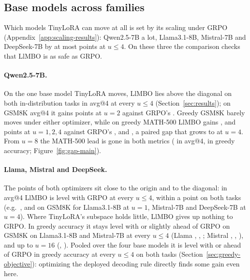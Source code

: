 \documentclass[twoside]{article}
\newcommand{\llmbo}{LlMBO}
\begin{document}
\subsection{Base models across families}
\label{sec:base}
\label{sec:scale}
\label{sec:gains}
\label{sec:per-model-base}

Which models TinyLoRA can move at all is set by its scaling under GRPO (Appendix~\ref{app:scaling-results}): Qwen2.5-7B a lot, Llama3.1-8B, Mistral-7B and DeepSeek-7B by at most \othersTinyBest{} points at $u \le 4$. On these three the comparison checks that \llmbo{} is as safe as GRPO.

\paragraph{Qwen2.5-7B.} On the one base model TinyLoRA moves, \llmbo{} lies above the diagonal on both in-distribution tasks in avg@4 at every $u \le 4$ (Section~\ref{sec:results}); on GSM8K avg@4 it gains \gainToneMeanQwenUTwoGsm{} points at $u = 2$ against GRPO's \gainGrpoMeanQwenUTwoGsm{}. Greedy GSM8K barely moves under either optimizer, while on greedy MATH-500 \llmbo{} gains \gainGreedyGreedyQwenUOneMathFive{}, \gainGreedyGreedyQwenUTwoMathFive{} and \gainGreedyGreedyQwenUFourMathFive{} points at $u = 1, 2, 4$ against GRPO's \gainGrpoGreedyQwenUOneMathFive{}, \gainGrpoGreedyQwenUTwoMathFive{} and \gainGrpoGreedyQwenUFourMathFive{}, a paired gap that grows to \gapGreedyGreedyQwenUFourMathFive{} at $u = 4$. From $u = 8$ the MATH-500 lead is gone in both metrics (\gapToneMeanQwenUEightMathFive{} in avg@4, \gapGreedyGreedyQwenUEightMathFive{} in greedy accuracy; Figure~\ref{fig:gap-main}).

\paragraph{Llama, Mistral and DeepSeek.} The points of both optimizers sit close to the origin and to the diagonal: in avg@4 \llmbo{} is level with GRPO at every $u \le 4$, within a point on both tasks (e.g.\ \gapToneMeanLlamaUOneGsm{}, \gapToneMeanMistralUFourGsm{} and \gapToneMeanDeepseekBaseUFourGsm{} on GSM8K for Llama3.1-8B at $u = 1$, Mistral-7B and DeepSeek-7B at $u = 4$). Where TinyLoRA's subspace holds little, \llmbo{} gives up nothing to GRPO. In greedy accuracy it stays level with or slightly ahead of GRPO on GSM8K on Llama3.1-8B and Mistral-7B at every $u \le 4$ (Llama \gapGreedyGreedyLlamaUOneGsm{}, \gapGreedyGreedyLlamaUTwoGsm{}, \gapGreedyGreedyLlamaUFourGsm{}; Mistral \gapGreedyGreedyMistralUOneGsm{}, \gapGreedyGreedyMistralUTwoGsm{}, \gapGreedyGreedyMistralUFourGsm{}), and up to $u = 16$ (\gapGreedyGreedyLlamaUSixteenGsm{}, \gapGreedyGreedyMistralUSixteenGsm{}). Pooled over the four base models it is level with or ahead of GRPO in greedy accuracy at every $u \le 4$ on both tasks (Section~\ref{sec:greedy-objective}): optimizing the deployed decoding rule directly finds some gain even here.
\end{document}
